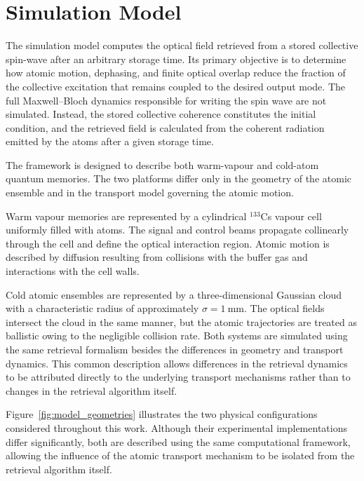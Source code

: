 \section{Simulation Model}
\label{sec:simulation_model}

The simulation model computes the optical field retrieved from a stored collective spin-wave after an arbitrary storage time. Its primary objective is to determine how atomic motion, dephasing, and finite optical overlap reduce the fraction of the collective excitation that remains coupled to the desired output mode. The full Maxwell--Bloch dynamics responsible for writing the spin wave are not simulated. Instead, the stored collective coherence constitutes the initial condition, and the retrieved field is calculated from the coherent radiation emitted by the atoms after a given storage time.

The framework is designed to describe both warm-vapour and cold-atom quantum memories. The two platforms differ only in the geometry of the atomic ensemble and in the transport model governing the atomic motion.

Warm vapour memories are represented by a cylindrical $^{133}$Cs vapour cell uniformly filled with atoms. The signal and control beams propagate collinearly through the cell and define the optical interaction region. Atomic motion is described by diffusion resulting from collisions with the buffer gas and interactions with the cell walls.

Cold atomic ensembles are represented by a three-dimensional Gaussian cloud with a characteristic radius of approximately $\sigma=\SI{1}{\milli\metre}$. The optical fields intersect the cloud in the same manner, but the atomic trajectories are treated as ballistic owing to the negligible collision rate. Both systems are simulated using the same retrieval formalism besides the differences in geometry and transport dynamics. This common description allows differences in the retrieval dynamics to be attributed directly to the underlying transport mechanisms rather than to changes in the retrieval algorithm itself.

Figure~\ref{fig:model_geometries} illustrates the two physical configurations considered throughout this work. Although their experimental implementations differ significantly, both are described using the same computational framework, allowing the influence of the atomic transport mechanism to be isolated from the retrieval algorithm itself.

